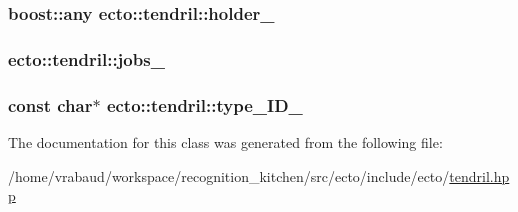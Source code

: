 \hypertarget{classecto_1_1tendril_a8bc7ae1c22c1af9765284666af02868b}{
\subsubsection[{holder\-\_\-}]{\setlength{\rightskip}{0pt plus 5cm}boost\-::any ecto\-::tendril\-::holder\-\_\-\hspace{0.3cm}{\ttfamily [private]}}}\label{classecto_1_1tendril_a8bc7ae1c22c1af9765284666af02868b}
\hypertarget{classecto_1_1tendril_acf171c75c0ace5cd108e8355ee83199c}{
\subsubsection[{jobs\-\_\-}]{ ecto\-::tendril\-::jobs\-\_\-\hspace{0.3cm}{\ttfamily [private]}}}\label{classecto_1_1tendril_acf171c75c0ace5cd108e8355ee83199c}
\hypertarget{classecto_1_1tendril_a5b237bfa0a9acefc48d577b77380058d}{
\subsubsection[{type\-\_\-\-I\-D\-\_\-}]{\setlength{\rightskip}{0pt plus 5cm}const char$\ast$ ecto\-::tendril\-::type\-\_\-\-I\-D\-\_\-\hspace{0.3cm}{\ttfamily [private]}}}\label{classecto_1_1tendril_a5b237bfa0a9acefc48d577b77380058d}


The documentation for this class was generated from the following file\-:\begin{DoxyCompactItemize}
\item 
/home/vrabaud/workspace/recognition\-\_\-kitchen/src/ecto/include/ecto/\hyperlink{tendril_8hpp}{tendril.\-hpp}\end{DoxyCompactItemize}
